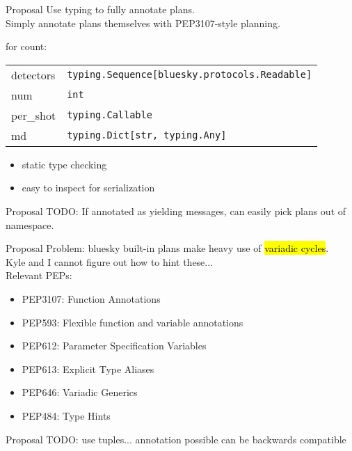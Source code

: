 \documentclass{presentation}
\begin{document}
\begin{frame}{Proposal}
  Use typing to fully annotate plans. \\
  Simply annotate plans themselves with PEP3107-style planning.

  \vfill

  for count:
  \begin{tabular}{ l | l }
    detectors & \texttt{typing.Sequence[bluesky.protocols.Readable]} \\
    num & \texttt{int} \\
    per\_shot & \texttt{typing.Callable} \\
    md & \texttt{typing.Dict[str, typing.Any]} \\
  \end{tabular}

  \vfill

  \begin{itemize}
    \item static type checking
    \item easy to inspect for serialization
  \end{itemize}
\end{frame}

\begin{frame}{Proposal}
  TODO: If annotated as yielding messages, can easily pick plans out of namespace.
\end{frame}

\begin{frame}{Proposal}
  Problem: bluesky built-in plans make heavy use of \hl{variadic cycles}. \\
  Kyle and I cannot figure out how to hint these... \\
  Relevant PEPs:
  \begin{itemize}
    \item PEP3107: Function Annotations
    \item PEP593: Flexible function and variable annotations
    \item PEP612: Parameter Specification Variables
    \item PEP613: Explicit Type Aliases
    \item PEP646: Variadic Generics
    \item PEP484: Type Hints
  \end{itemize}
\end{frame}

\begin{frame}{Proposal}
  TODO: use tuples... annotation possible can be backwards compatible
\end{frame}
\end{document}
